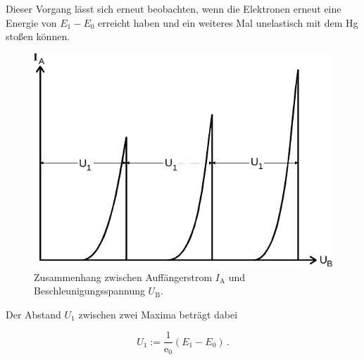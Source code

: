 Dieser Vorgang lässt sich erneut beobachten, wenn die Elektronen erneut
eine Energie von $E_1 - E_0$ erreicht haben und ein weiteres Mal unelastisch mit
dem Hg stoßen können.

\begin{figure}[H]
    \centering
    \includegraphics{figures/Abb_2.pdf}
    \caption{Zusammenhang zwischen Auffängerstrom $I_\text{A}$ und Beschleunigungsspannung $U_\text{B}$\cite{ap08}.}
    \label{fig:abb2}
\end{figure}

Der Abstand $U_1$ zwischen zwei Maxima beträgt dabei

\begin{equation}
    U_1 := \frac{1}{\text{e}_0} (E_1 - E_0) \,.
\end{equation}